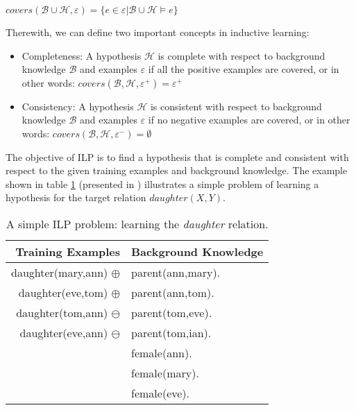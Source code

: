 \begin{center}
 $covers(\mathcal{B} \cup \mathcal{H},\varepsilon)=\{e \in \varepsilon | \mathcal{B} \cup \mathcal{H} \models e\}$
\end{center}

Therewith, we can define two important concepts in inductive learning:

\begin{itemize}
 \item Completeness: A hypothesis $\mathcal{H}$ is complete with respect to background knowledge $\mathcal{B}$ and
examples $\varepsilon$ if all the positive examples are covered, or in other words:
$covers(\mathcal{B},\mathcal{H},\varepsilon^{+})=\varepsilon^{+}$
 \item Consistency: A hypothesis $\mathcal{H}$ is consistent with respect to background knowledge $\mathcal{B}$ and
examples $\varepsilon$ if no negative examples are covered, or in other words:
$covers(\mathcal{B},\mathcal{H},\varepsilon^{-})=\emptyset$
\end{itemize}

The objective of ILP is to find a hypothesis that is complete and consistent with respect to the given training
examples and background knowledge. The example shown in table \ref{tb:ilpExample} (presented in
\cite{DBLP:journals/ml/LavracD96})
illustrates a simple problem of learning a hypothesis for the target relation $daughter(X,Y)$.

\begin{center}
    \begin{table}
    \label{tb:ilpExample}
    \caption{A simple ILP problem: learning the \emph{daughter} relation.}
      \begin{tabular}{ r | l }
      \toprule
      \textbf{Training Examples} & \textbf{Background Knowledge}\\
      \midrule
      daughter(mary,ann) $\oplus$	& parent(ann,mary).	\\
      daughter(eve,tom) $\oplus$	& parent(ann,tom).	\\
      daughter(tom,ann) $\ominus$ 	& parent(tom,eve).	\\
      daughter(eve,ann) $\ominus$	& parent(tom,ian).	\\
					& female(ann).		\\
					& female(mary).		\\
					& female(eve).		\\
      \bottomrule
      \end{tabular}
    \end{table}
\end{center}

